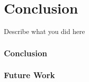 \chapter{Conclusion}
\label{cha:conclusion}
Describe what you did here
\subsection{Conclusion}
\subsection{Future Work}
